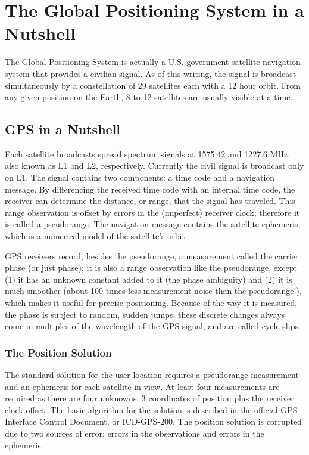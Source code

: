 \chapter{The Global Positioning System in a Nutshell}

The Global Positioning System is actually a U.S. government satellite navigation system that provides a civilian signal. As of this writing, the signal is broadcast simultaneously by a constellation of 29 satellites each with a 12 hour orbit. From any given position on the Earth, 8 to 12 satellites are usually visible at a time.

\section{GPS in a Nutshell}

Each satellite broadcasts spread spectrum signals at 1575.42 and 1227.6 MHz, also known as L1 and L2, respectively. Currently the civil signal is broadcast only on L1. The signal contains two components: a time code and a navigation message. By differencing the received time code with an internal time code, the receiver can determine the distance, or range, that the signal has traveled. This range observation is offset by errors in the (imperfect) receiver clock; therefore it is called a pseudorange. The navigation message contains the satellite ephemeris, which is a numerical model of the satellite's orbit.

GPS receivers record, besides the pseudorange, a measurement called the carrier phase (or just phase); it is also a range observation like the pseudorange, except (1) it has an unknown constant added to it (the phase ambiguity) and (2) it is much smoother (about 100 times less measurement noise than the pseudorange!), which makes it useful for precise positioning. Because of the way it is measured, the phase is subject to random, sudden jumps; these discrete changes always come in multiples of the wavelength of the GPS signal, and are called cycle slips.


\subsection{The Position Solution}

The standard solution for the user location requires a pseudorange measurement and an ephemeris for each satellite in view. At least four measurements are required as there are four unknowns: 3 coordinates of position plus the receiver clock offset. The basic algorithm for the solution is described in the official GPS Interface Control Document, or ICD-GPS-200. The position solution is corrupted due to two sources of error: errors in the observations and errors in the ephemeris.


